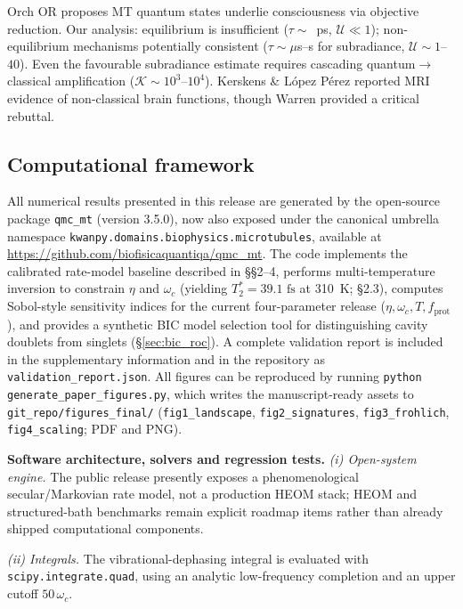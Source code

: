 \documentclass[twocolumn,10pt]{article}
\newcommand{\fs}{\text{~fs}}
\begin{document}
Orch OR \cite{Penrose1994,Hameroff2014} proposes MT quantum states underlie
consciousness via objective reduction. Our analysis: equilibrium is
insufficient ($\tau \sim$~ps, $\mathcal{U} \ll 1$); non-equilibrium
mechanisms potentially consistent ($\tau \sim \mu$s--s for subradiance,
$\mathcal{U}\sim 1$--$40$). Even the favourable subradiance estimate
requires cascading quantum$\to$classical amplification
($\mathcal{K} \sim 10^3$--$10^4$). Kerskens \& L\'opez P\'erez
\cite{Kerskens2022} reported MRI evidence of non-classical brain
functions, though Warren \cite{Warren2023} provided a critical rebuttal.


\subsection{Computational framework}
\label{sec:code}

All numerical results presented in this release are generated by the
open-source package \texttt{qmc\_mt} (version 3.5.0), now also exposed under
the canonical umbrella namespace \texttt{kwanpy.domains.biophysics.microtubules},
available at \url{https://github.com/biofisicaquantiqa/qmc_mt}. The code
implements the calibrated rate-model baseline described in \S\S 2--4,
performs multi-temperature inversion to constrain $\eta$ and $\omega_c$
(yielding $T_2^* = 39.1\fs$ at 310~K; \S 2.3), computes Sobol-style
sensitivity indices for the current four-parameter release
($\eta,\omega_c,T,f_{\text{prot}}$), and provides a synthetic BIC model
selection tool for distinguishing cavity doublets from singlets
(\S\ref{sec:bic_roc}). A complete validation report is included
in the supplementary information and in the repository as
\texttt{validation\_report.json}. All figures can be reproduced by
running \texttt{python generate\_paper\_figures.py}, which writes the
manuscript-ready assets to \texttt{git\_repo/figures\_final/}
(\texttt{fig1\_landscape}, \texttt{fig2\_signatures},
\texttt{fig3\_frohlich}, \texttt{fig4\_scaling}; PDF and PNG).

\textbf{Software architecture, solvers and regression tests.}
\emph{(i) Open-system engine.} The public release presently exposes a
phenomenological secular/Markovian rate model, not a production HEOM stack;
HEOM and structured-bath benchmarks remain explicit roadmap items rather than
already shipped computational components.

\emph{(ii) Integrals.} The vibrational-dephasing integral is evaluated with
\texttt{scipy.integrate.quad}, using an analytic low-frequency completion and
an upper cutoff $50\,\omega_c$.
\end{document}

